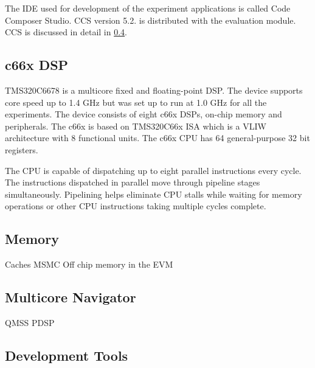 The IDE used for development of the experiment applications is called Code
Composer Studio. CCS version 5.2. is distributed with the evaluation module.
CCS is discussed in detail in \ref{subsec:devtools}.

\subsection{c66x DSP}
TMS320C6678 is a multicore fixed and floating-point DSP. The device supports
core speed up to 1.4 GHz but was set up to run at 1.0 GHz for all the
experiments. The device consists of eight c66x DSPs, on-chip memory and
peripherals. The c66x is based on TMS320C66x ISA which is a VLIW architecture
with 8 functional units. The c66x CPU has 64 general-purpose 32 bit registers.
\cite{sprugh7}

The CPU is capable of dispatching up to eight parallel instructions every
cycle. The instructions dispatched in parallel move through pipeline stages
simultaneously. Pipelining helps eliminate CPU stalls while waiting for memory
operations or other CPU instructions taking multiple cycles complete.
\cite{sprugh7}

\subsection{Memory}
\label{subsec:c66memory}
Caches
MSMC
Off chip memory in the EVM
\subsection{Multicore Navigator}
\label{subsec:multicorenav}
QMSS
PDSP
\subsection{Development Tools}
\label{subsec:devtools}

